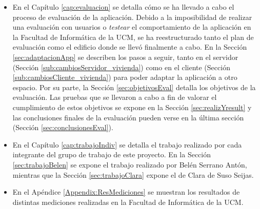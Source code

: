 \begin{itemize}
	\item En el Capítulo \ref{cap:evaluacion} se detalla cómo se ha llevado a cabo el proceso de evaluación de la aplicación. Debido a la imposibilidad de realizar una evaluación con usuarios o \textit{testear} el comportamiento de la aplicación en la Facultad de Informática de la UCM, se ha reestructurado tanto el plan de evaluación como el edificio donde se llevó finalmente a cabo. En la Sección \ref{sec:adaptacionApp} se describen los pasos a seguir, tanto en el servidor (Sección \ref{sub:cambiosServidor_vivienda}) como en el cliente (Sección \ref{sub:cambiosCliente_vivienda}) para poder adaptar la aplicación a otro espacio. Por su parte, la Sección \ref{sec:objetivosEval} detalla los objetivos de la evaluación. Las pruebas que se llevaron a cabo a fin de valorar el cumplimiento de estos objetivos se expone en la Sección \ref{sec:realizYresult} y las conclusiones finales de la evaluación pueden verse en la última sección (Sección \ref{sec:conclusionesEval}).
	
	\item En el Capítulo \ref{cap:trabajoIndiv} se detalla el trabajo realizado por cada integrante del grupo de trabajo de este proyecto. En la Sección \ref{sec:trabajoBelen} se expone el trabajo realizado por Belén Serrano Antón, mientras que la Sección \ref{sec:trabajoClara} expone el de Clara de Suso Seijas.
	
	\item En el Apéndice \ref{Appendix:ResMediciones} se muestran los resultados de distintas mediciones realizadas en la Facultad de Informática de la UCM.
	
\end{itemize}
